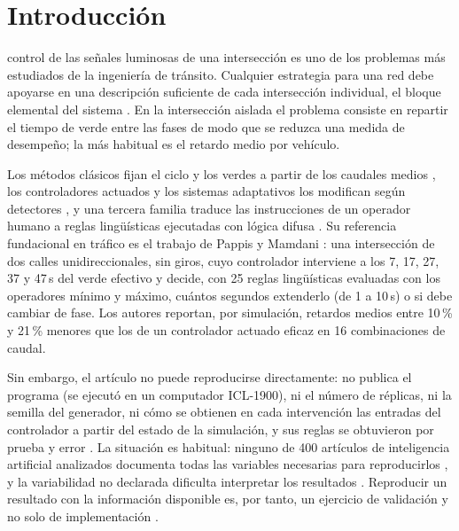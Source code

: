 \documentclass[journal]{IEEEtran}
\begin{document}
\section{Introducción}
\label{sec:intro}

 control de las señales luminosas de una intersección es uno de los problemas más estudiados de la ingeniería de tránsito. Cualquier estrategia para una red debe apoyarse en una descripción suficiente de cada intersección individual, el bloque elemental del sistema \cite{Pappis1977,Papageorgiou2003}. En la intersección aislada el problema consiste en repartir el tiempo de verde entre las fases de modo que se reduzca una medida de desempeño; la más habitual es el retardo medio por vehículo.

Los métodos clásicos fijan el ciclo y los verdes a partir de los caudales medios \cite{Webster1958,Webster1966,Miller1963,Allsop1971}, los controladores actuados y los sistemas adaptativos los modifican según detectores \cite{Hunt1982,Lowrie1982,Mirchandani2001}, y una tercera familia traduce las instrucciones de un operador humano a reglas lingüísticas ejecutadas con lógica difusa \cite{Zadeh1965,Zadeh1973,MamdaniAssilian1975}. Su referencia fundacional en tráfico es el trabajo de Pappis y Mamdani \cite{Pappis1977}: una intersección de dos calles unidireccionales, sin giros, cuyo controlador interviene a los 7, 17, 27, 37 y 47\,s del verde efectivo y decide, con 25 reglas lingüísticas evaluadas con los operadores mínimo y máximo, cuántos segundos extenderlo (de 1 a 10\,s) o si debe cambiar de fase. Los autores reportan, por simulación, retardos medios entre 10\,\% y 21\,\% menores que los de un controlador actuado eficaz en 16 combinaciones de caudal.

Sin embargo, el artículo no puede reproducirse directamente: no publica el programa (se ejecutó en un computador ICL-1900), ni el número de réplicas, ni la semilla del generador, ni cómo se obtienen en cada intervención las entradas del controlador a partir del estado de la simulación, y sus reglas se obtuvieron por prueba y error \cite{Pappis1977}. La situación es habitual: ninguno de 400 artículos de inteligencia artificial analizados documenta todas las variables necesarias para reproducirlos \cite{Gundersen2018}, y la variabilidad no declarada dificulta interpretar los resultados \cite{Henderson2018}. Reproducir un resultado con la información disponible es, por tanto, un ejercicio de validación y no solo de implementación \cite{Peng2011,Sandve2013,Pineau2021}.
\end{document}
